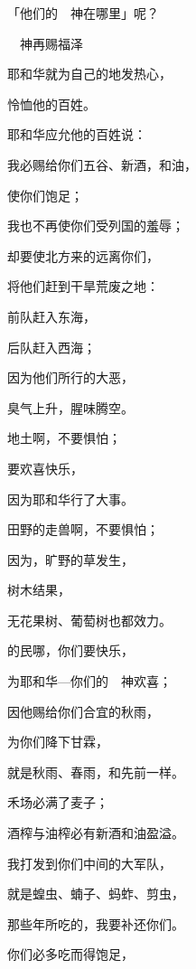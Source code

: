 {\par }{\Q 「他们的　神在哪里」呢？
\par }{\SH 　神再赐福泽
\par }{\Q {}耶和华就为自己的地发热心，
\par }{\Q 怜恤他的百姓。
\par }{\Q {}耶和华应允他的百姓说：
\par }{\Q 我必赐给你们五谷、新酒，和油，
\par }{\Q 使你们饱足；
\par }{\Q 我也不再使你们受列国的羞辱；
\par }{\Q {}却要使北方来的{}远离你们，
\par }{\Q 将他们赶到干旱荒废之地：
\par }{\Q 前队赶入东海，
\par }{\Q 后队赶入西海；
\par }{\Q 因为他们所行的大恶，
\par }{\Q 臭气上升，腥味腾空。
\par }{\BB \par }{\Q {}地土啊，不要惧怕；
\par }{\Q 要欢喜快乐，
\par }{\Q 因为耶和华行了大事。
\par }{\Q {}田野的走兽啊，不要惧怕；
\par }{\Q 因为，旷野的草发生，
\par }{\Q 树木结果，
\par }{\Q 无花果树、葡萄树也都效力。
\par }{\BB \par }{\Q {}的民哪，你们要快乐，
\par }{\Q 为耶和华—你们的　神欢喜；
\par }{\Q 因他赐给你们合宜的秋雨，
\par }{\Q 为你们降下甘霖，
\par }{\Q 就是秋雨、春雨，和先前一样。
\par }{\BB \par }{\Q {}禾场必满了麦子；
\par }{\Q 酒榨与油榨必有新酒和油盈溢。
\par }{\Q {}我打发到你们中间的大军队，
\par }{\Q 就是蝗虫、蝻子、蚂蚱、剪虫，
\par }{\Q 那些年所吃的，我要补还你们。
\par }{\BB \par }{\Q {}你们必多吃而得饱足，
}
